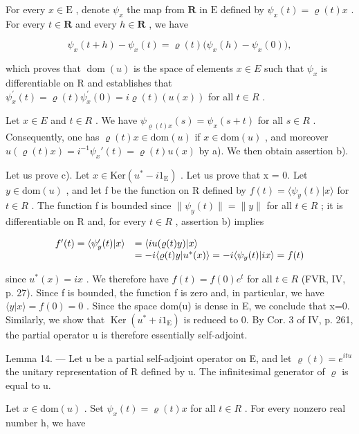 For every \(x \in \mathrm{E}\) , denote \(\psi_x\) the map from \(\mathbf{R}\) in \(\mathrm{E}\) defined by \(\psi_x(t) = \varrho(t)x\) . For every \(t \in \mathbf{R}\) and every \(h \in \mathbf{R}\) , we have

\[
\psi_ {x} (t + h) - \psi_ {x} (t) = \varrho (t) \big (\psi_ {x} (h) - \psi_ {x} (0) \big),
\]

which proves that \(\operatorname{dom}(u)\) is the space of elements \(x \in E\) such that \(\psi_{x}\) is differentiable on R and establishes that \(\psi_{x}^{\prime}(t) = \varrho(t)\psi_{x}^{\prime}(0) = i\varrho(t)(u(x))\) for all \(t \in R\) .

Let \(x \in E\) and \(t \in R\) . We have \(\psi_{\varrho(t)x}(s) = \psi_x(s + t)\) for all \(s \in R\) . Consequently, one has \(\varrho(t)x \in \text{dom}(u)\) if \(x \in \text{dom}(u)\) , and moreover \(u(\varrho(t)x) = i^{-1}\psi_x'(t) = \varrho(t)u(x)\) by a). We then obtain assertion b).

Let us prove c). Let \(x \in \text{Ker}(u^{*} - i1_{\text{E}})\) . Let us prove that x = 0. Let \(y \in \text{dom}(u)\) , and let f be the function on R defined by \(f(t) = \langle \psi_{y}(t) | x \rangle\) for \(t \in R\) . The function f is bounded since \(\| \psi_{y}(t) \| = \| y \|\) for all \(t \in R\) ; it is differentiable on R and, for every \(t \in R\) , assertion b) implies

\[
\begin{array}{r l} f ^ {\prime} (t) = \langle \psi_ {y} ^ {\prime} (t) | x \rangle & = \langle i u (\varrho (t) y) | x \rangle \\ & = - i \langle \varrho (t) y | u ^ {*} (x) \rangle = - i \langle \psi_ {y} (t) | i x \rangle = f (t) \end{array}
\]

since \(u^{*}(x)=ix\) . We therefore have \(f(t)=f(0)e^{t}\) for all \(t\in R\) (FVR, IV, p. 27). Since f is bounded, the function f is zero and, in particular, we have \(\langle y|x\rangle=f(0)=0\) . Since the space dom(u) is dense in E, we conclude that x=0. Similarly, we show that \(\operatorname{Ker}(u^{*}+i1_{\mathrm{E}})\) is reduced to 0. By Cor. 3 of IV, p. 261, the partial operator u is therefore essentially self-adjoint.

Lemma 14. --- Let u be a partial self-adjoint operator on E, and let \(\varrho(t) = e^{itu}\) the unitary representation of R defined by u. The infinitesimal generator of \(\varrho\) is equal to u.

Let \(x \in \text{dom}(u)\) . Set \(\psi_{x}(t) = \varrho(t)x\) for all \(t \in R\) . For every nonzero real number h, we have

